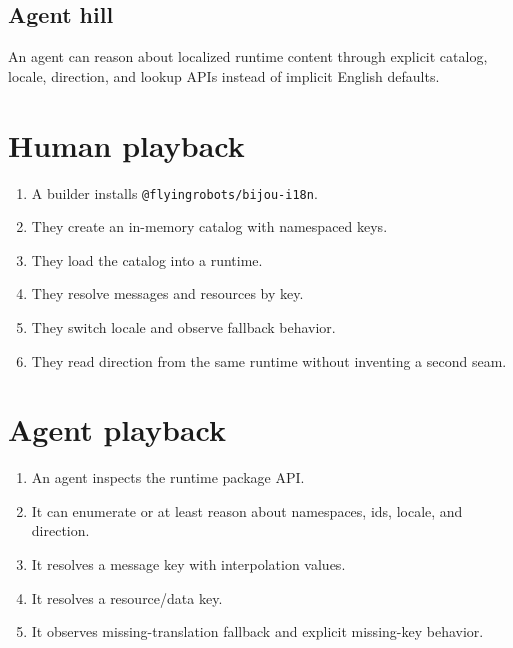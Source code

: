 \subsection{Agent hill}\label{record-188-agent-hill}

An agent can reason about localized runtime content through explicit catalog, locale, direction, and lookup APIs instead of implicit English defaults.

\section{Human playback}\label{record-188-human-playback}

\begin{enumerate}
\def\labelenumi{\arabic{enumi}.}
\tightlist
\item
  A builder installs \texttt{@\allowbreak{}f\allowbreak{}l\allowbreak{}y\allowbreak{}i\allowbreak{}n\allowbreak{}g\allowbreak{}r\allowbreak{}o\allowbreak{}b\allowbreak{}o\allowbreak{}t\allowbreak{}s\allowbreak{}/\allowbreak{}b\allowbreak{}i\allowbreak{}j\allowbreak{}o\allowbreak{}u\allowbreak{}-\allowbreak{}i\allowbreak{}1\allowbreak{}8\allowbreak{}n}.
\item
  They create an in-memory catalog with namespaced keys.
\item
  They load the catalog into a runtime.
\item
  They resolve messages and resources by key.
\item
  They switch locale and observe fallback behavior.
\item
  They read direction from the same runtime without inventing a second seam.
\end{enumerate}

\section{Agent playback}\label{record-188-agent-playback}

\begin{enumerate}
\def\labelenumi{\arabic{enumi}.}
\tightlist
\item
  An agent inspects the runtime package API.
\item
  It can enumerate or at least reason about namespaces, ids, locale, and direction.
\item
  It resolves a message key with interpolation values.
\item
  It resolves a resource/data key.
\item
  It observes missing-translation fallback and explicit missing-key behavior.
\end{enumerate}

